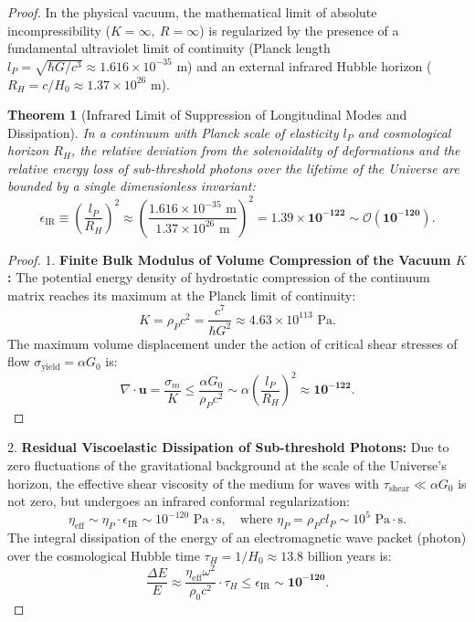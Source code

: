 \documentclass[12pt,a4paper]{article}
\newtheorem{theorem}{Theorem}
\begin{document}
\begin{proof}
	In the physical vacuum, the mathematical limit of absolute incompressibility ($K = \infty, \ R = \infty$) is regularized by the presence of a fundamental ultraviolet limit of continuity (Planck length $l_P = \sqrt{\hbar G / c^3} \approx 1.616 \times 10^{-35}$ m) and an external infrared Hubble horizon ($R_H = c / H_0 \approx 1.37 \times 10^{26}$ m).
												
	\begin{theorem}[Infrared Limit of Suppression of Longitudinal Modes and Dissipation]
	In a continuum with Planck scale of elasticity $l_P$ and cosmological horizon $R_H$, the relative deviation from the solenoidality of deformations and the relative energy loss of sub-threshold photons over the lifetime of the Universe are bounded by a single dimensionless invariant:
	\begin{equation}
	\epsilon_{\mathrm{IR}} \equiv \left( \frac{l_P}{R_H} \right)^2 \approx \left( \frac{1.616 \times 10^{-35} \text{ m}}{1.37 \times 10^{26} \text{ m}} \right)^2 = \mathbf{1.39 \times 10^{-122} \sim \mathcal{O}(10^{-120})}.
	\end{equation}
	\end{theorem}
													
	\begin{proof}
	1. \textbf{Finite Bulk Modulus of Volume Compression of the Vacuum $K$:}
	The potential energy density of hydrostatic compression of the continuum matrix reaches its maximum at the Planck limit of continuity:
	\begin{equation}
	K = \rho_P c^2 = \frac{c^7}{\hbar G^2} \approx 4.63 \times 10^{113} \text{ Pa}.
	\end{equation}
	The maximum volume displacement under the action of critical shear stresses of flow $\sigma_{\text{yield}} = \alpha G_0$ is:
	\begin{equation}
	\nabla \cdot \mathbf{u} = \frac{\sigma_m}{K} \le \frac{\alpha G_0}{\rho_P c^2} \sim \alpha \left( \frac{l_P}{R_H} \right)^2 \approx \mathbf{10^{-122}}.
	\end{equation}
	\end{proof}
														
	2. \textbf{Residual Viscoelastic Dissipation of Sub-threshold Photons:}
	Due to zero fluctuations of the gravitational background at the scale of the Universe's horizon, the effective shear viscosity of the medium for waves with $\tau_{\text{shear}} \ll \alpha G_0$ is not zero, but undergoes an infrared conformal regularization:
	\begin{equation}
	\eta_{\text{eff}} \sim \eta_P \cdot \epsilon_{\text{IR}} \sim 10^{-120} \text{ Pa}\cdot\text{s}, \quad \text{where } \eta_P = \rho_P c l_P \sim 10^5 \text{ Pa}\cdot\text{s}.
	\end{equation}
	The integral dissipation of the energy of an electromagnetic wave packet (photon) over the cosmological Hubble time $\tau_H = 1/H_0 \approx 13.8$ billion years is:
	\begin{equation}
	\frac{\Delta E}{E} \approx \frac{\eta_{\text{eff}} \omega^2}{\rho_0 c^2} \cdot \tau_H \le \epsilon_{\text{IR}} \sim \mathbf{10^{-120}}.
	\end{equation}
													

\end{proof}
\end{document}

